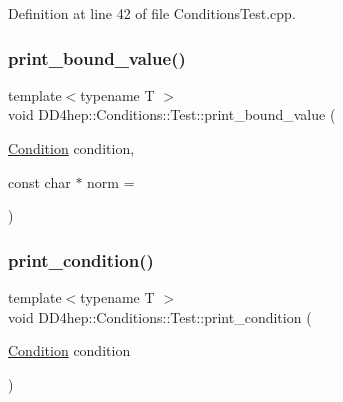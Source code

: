 Definition at line 42 of file Conditions\+Test.\+cpp.

\hypertarget{namespace_d_d4hep_1_1_conditions_1_1_test_a6d29c42c2457ef64a8d01f75f015cb4e}{}\label{namespace_d_d4hep_1_1_conditions_1_1_test_a6d29c42c2457ef64a8d01f75f015cb4e} 
\subsubsection{\texorpdfstring{print\+\_\+bound\+\_\+value()}{print\_bound\_value()}}
{\footnotesize\ttfamily template$<$typename T $>$ \\
void D\+D4hep\+::\+Conditions\+::\+Test\+::print\+\_\+bound\+\_\+value (\begin{DoxyParamCaption}\item[{\hyperlink{class_d_d4hep_1_1_conditions_1_1_condition}{Condition}}]{condition,  }\item[{const char $\ast$}]{norm = {} }\end{DoxyParamCaption})}

\hypertarget{namespace_d_d4hep_1_1_conditions_1_1_test_abda07299d246381a69fa136862ed0085}{}\label{namespace_d_d4hep_1_1_conditions_1_1_test_abda07299d246381a69fa136862ed0085} 
\subsubsection{\texorpdfstring{print\+\_\+condition()}{print\_condition()}}
{\footnotesize\ttfamily template$<$typename T $>$ \\
void D\+D4hep\+::\+Conditions\+::\+Test\+::print\+\_\+condition (\begin{DoxyParamCaption}\item[{\hyperlink{class_d_d4hep_1_1_conditions_1_1_condition}{Condition}}]{condition }\end{DoxyParamCaption})}

\hypertarget{namespace_d_d4hep_1_1_conditions_1_1_test_a3a38a064024bb5bb204eeb9c005b2bf6}{}\label{namespace_d_d4hep_1_1_conditions_1_1_test_a3a38a064024bb5bb204eeb9c005b2bf6} 
